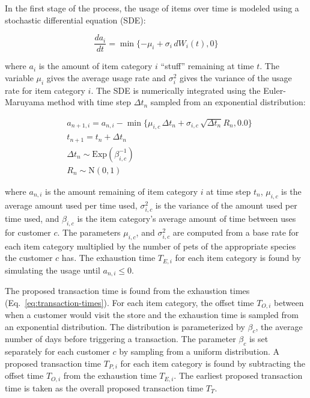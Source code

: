 \documentclass[conference]{IEEEtran}
\begin{document}
In the first stage of the process, the usage of items over time is modeled using a stochastic differential equation (SDE):

\begin{equation*}
\frac{da_i}{dt} = \min \{-\mu_i + \sigma_i\, dW_i(t), 0\}
\end{equation*}

where $a_i$ is the amount of item category $i$ ``stuff'' remaining at time $t$. The variable $\mu_i$ gives the average usage rate and $\sigma^2_i$ gives the variance of the usage rate for item category $i$. The SDE is numerically integrated using the Euler-Maruyama method\cite{Klouden13} with time step $\Delta t_n$ sampled from an exponential distribution:

\begin{align*}
&a_{n+1, i} = a_{n,i} - \min \{\mu_{i, c} \, \Delta t_n + \sigma_{i, c} \, \sqrt{\Delta t_n} R_n, 0.0\} \\
&t_{n+1} = t_n + \Delta t_n \\
&\Delta t_n \sim \text{Exp}(\beta^{-1}_{i,c}) \\
&R_n \sim \text{N}(0, 1)
\end{align*}

where $a_{n, i}$ is the amount remaining of item category $i$ at time step $t_n$, $\mu_{i,c}$ is the average amount used per time used, $\sigma^2_{i,c}$ is the variance of the amount used per time used, and $\beta_{i,c}$ is the item category's average amount of time between uses for customer $c$.  The parameters $\mu_{i, c}$, and $\sigma^2_{i,c}$ are computed from a base rate for each item category multiplied by the number of pets of the appropriate species the customer $c$ has.  The exhaustion time $T_{E,i}$ for each item category is found by simulating the usage until $a_{n,i} \leq 0$.

The proposed transaction time is found from the exhaustion times (Eq.~\ref{eq:transaction-times}).  For each item category, the offset time $T_{O, i}$ between when a customer would visit the store and the exhaustion time is sampled from an exponential distribution. The distribution is parameterized by $\beta_c$, the average number of days before triggering a transaction. The parameter $\beta_c$ is set separately for each customer $c$ by sampling from a uniform distribution. A proposed transaction time $T_{P, i}$ for each item category is found by subtracting the offset time $T_{O, i}$ from the exhaustion time $T_{E, i}$.  The earliest proposed transaction time is taken as the overall proposed transaction time $T_T$.
\end{document}
